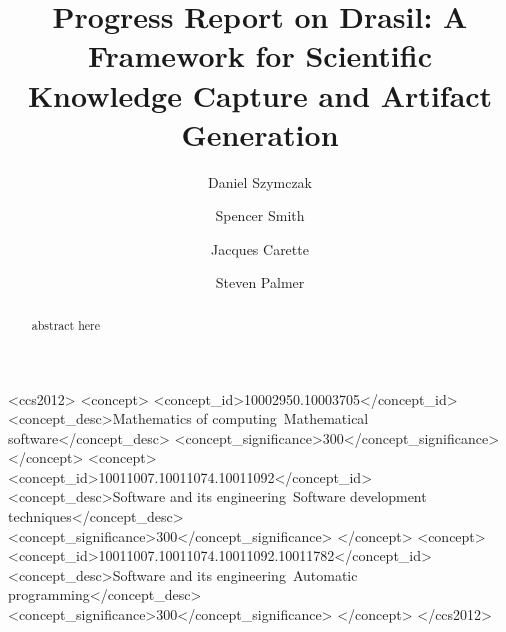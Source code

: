 \documentclass[sigconf]{acmart}
\begin{document}
\title[Progress Report on Drasil]{Progress Report on Drasil: A Framework for Scientific Knowledge Capture and Artifact Generation}

\author{Daniel Szymczak}

\author{Spencer Smith}

\author{Jacques Carette}

\author{Steven Palmer}


\begin{abstract}
abstract here
\end{abstract}

%
%
 \begin{CCSXML}
<ccs2012>
<concept>
<concept_id>10002950.10003705</concept_id>
<concept_desc>Mathematics of computing~Mathematical software</concept_desc>
<concept_significance>300</concept_significance>
</concept>
<concept>
<concept_id>10011007.10011074.10011092</concept_id>
<concept_desc>Software and its engineering~Software development techniques</concept_desc>
<concept_significance>300</concept_significance>
</concept>
<concept>
<concept_id>10011007.10011074.10011092.10011782</concept_id>
<concept_desc>Software and its engineering~Automatic programming</concept_desc>
<concept_significance>300</concept_significance>
</concept>
</ccs2012>
\end{CCSXML}
\end{document}
